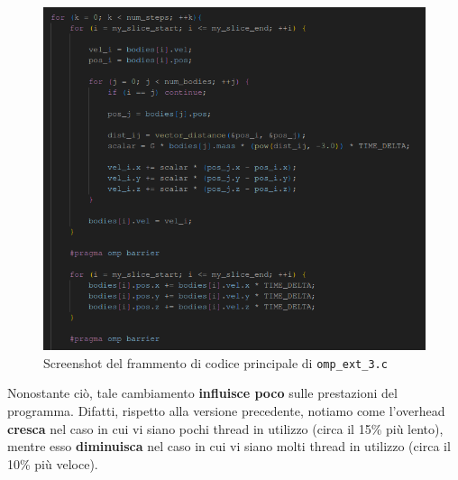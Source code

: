 \documentclass[12pt]{report}
\begin{document}
    \begin{figure}[H]
        \centering
        \includegraphics[width=\textwidth]{images/omp_ext_3_2.png}
        \caption{Screenshot del frammento di codice principale di \texttt{omp\_ext\_3.c}}
        \label{fig:omp_ext_3}
    \end{figure}

    Nonostante ciò, tale cambiamento \textbf{influisce poco} sulle prestazioni del programma. Difatti, rispetto alla versione precedente, notiamo come l'overhead \textbf{cresca} nel caso in cui vi siano pochi thread in utilizzo (circa il 15\% più lento), mentre esso \textbf{diminuisca} nel caso in cui vi siano molti thread in utilizzo (circa il 10\% più veloce).
\end{document}
